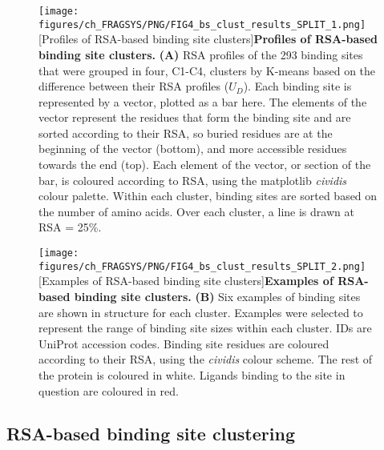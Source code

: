 \begin{figure}[hb!]
    \centering
    \texttt{[image: figures/ch\_FRAGSYS/PNG/FIG4\_bs\_clust\_results\_SPLIT\_1.png]}
    [Profiles of RSA-based binding site clusters]{\textbf{Profiles of RSA-based binding site clusters.} \textbf{(A)} RSA profiles of the 293 binding sites that were grouped in four, C1-C4, clusters by K-means based on the difference between their RSA profiles ($U_{D}$). Each binding site is represented by a vector, plotted as a bar here. The elements of the vector represent the residues that form the binding site and are sorted according to their RSA, so buried residues are at the beginning of the vector (bottom), and more accessible residues towards the end (top). Each element of the vector, or section of the bar, is coloured according to RSA, using the matplotlib  \textit{cividis} colour palette. Within each cluster, binding sites are sorted based on the number of amino acids. Over each cluster, a line is drawn at RSA = 25\%.}
\label{fig:bss_clust_profiles}
\end{figure}

\begin{figure}[ht!]
    \centering
    \texttt{[image: figures/ch\_FRAGSYS/PNG/FIG4\_bs\_clust\_results\_SPLIT\_2.png]}
    [Examples of RSA-based binding site clusters]{\textbf{Examples of RSA-based binding site clusters.} \textbf{(B)} Six examples of binding sites are shown in structure for each cluster. Examples were selected to represent the range of binding site sizes within each cluster. IDs are UniProt accession codes. Binding site residues are coloured according to their RSA, using the \textit{cividis} colour scheme. The rest of the protein is coloured in white. Ligands binding to the site in question are coloured in red.}
\label{fig:bss_clusts_examples}
\end{figure}

\subsection{RSA-based binding site clustering}

